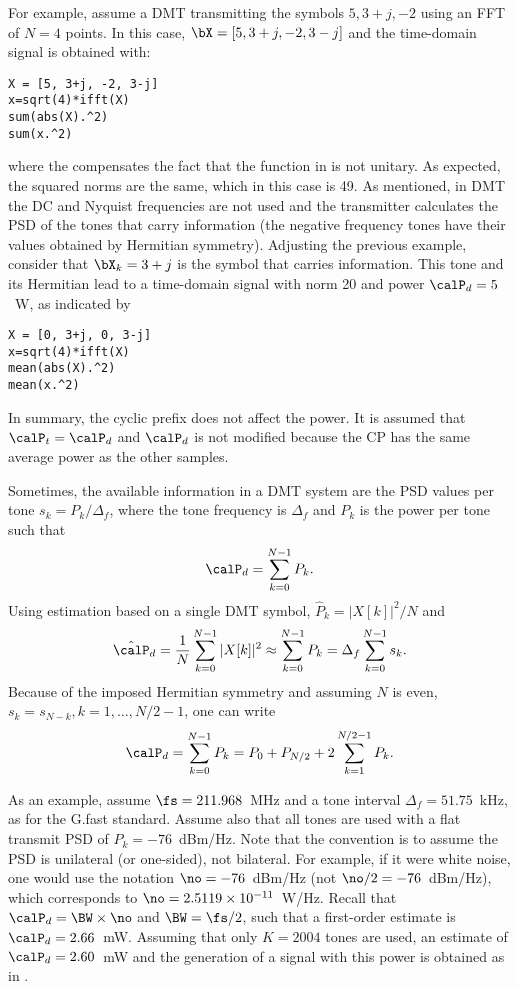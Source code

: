 For example, assume a DMT transmitting the symbols $5, 3+j, -2$ using an FFT of $N=4$ points. In this case, $\bX = [5, 3+j, -2, 3-j]$ and the time-domain signal is obtained with:
\begin{lstlisting}
X = [5, 3+j, -2, 3-j]
x=sqrt(4)*ifft(X)
sum(abs(X).^2)
sum(x.^2)
\end{lstlisting}
where the  compensates the fact that the  function in {\matlab} is not unitary. As expected, the squared norms are the same, which in this case is 49.
As mentioned, in DMT the DC and Nyquist frequencies are not used and the transmitter calculates the PSD of the tones that carry information (the negative frequency tones have their values obtained by Hermitian symmetry). Adjusting the previous example, consider that $\bX_k = 3+j$ is the symbol that carries information. This tone and its Hermitian lead to a time-domain signal with norm 20 and power $\calP_d = 5$~W, as indicated by
\begin{lstlisting}
X = [0, 3+j, 0, 3-j]
x=sqrt(4)*ifft(X)
mean(abs(X).^2)
mean(x.^2)
\end{lstlisting}

In summary, the cyclic prefix does not affect the power. 
It is assumed that $\calP_t=\calP_d$ and $\calP_d$ is not modified because the CP has the same average power as the other samples. 


Sometimes, the available information in a DMT system are the PSD values per tone $s_k = P_k / \Delta_f$, where the tone frequency is $\Delta_f$ and $P_k$
is the power per tone such that 
\[
\calP_d = \sum_{k=0}^{N-1} P_k.
\]
Using estimation based on a single DMT symbol, $\hat P_k = |X[k]|^2/N$ and
\[
\hat \calP_d = \frac{1}{N}\sum_{k=0}^{N-1} |X[k]|^2 \approx \sum_{k=0}^{N-1} P_k = \Delta_f \sum_{k=0}^{N-1} s_k.
\]
Because of the imposed Hermitian symmetry and assuming $N$ is even, $s_k = s_{N-k}, k=1,\ldots,N/2-1$, one can write
\[
\calP_d = \sum_{k=0}^{N-1} P_k = P_0 + P_{N/2} + 2 \sum_{k=1}^{N/2-1} P_k.
\]

As an example, assume $\fs=211.968$~MHz and a tone interval $\Delta_f = 51.75$~kHz, as for the G.fast standard. Assume also that all tones are used with a flat transmit PSD of $P_k = -76$~dBm/Hz. Note that the convention is to assume the PSD is unilateral (or one-sided), not bilateral. For example, if it were white noise, one would use the notation $\no = -76$~dBm/Hz (not $\no / 2 = -76$~dBm/Hz), which corresponds to $\no = 2.5119 \times 10^{-11}$~W/Hz. Recall that $\calP_d = \BW \times \no$ and $\BW = \fs/2$, such that a first-order estimate is $\calP_d = 2.66$~mW. Assuming that only $K=2004$ tones are used, an estimate of $\calP_d = 2.60$~mW and the generation of a signal with this power is obtained as in .


